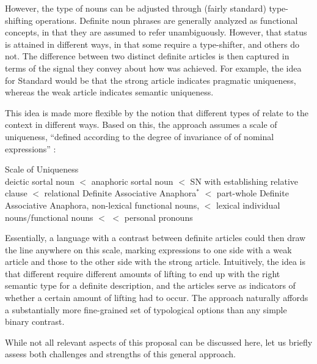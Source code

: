 \documentclass[output=paper
,modfonts
,nonflat]{langscibook}
\begin{document}
However, the type of nouns can be adjusted through (fairly standard)
type-shifting operations. Definite noun phrases are generally analyzed as functional
concepts, in that they are assumed to refer unambiguously. However,
that status is attained in different ways, in that some  require
a type-shifter, and others do not. The difference between two distinct
definite articles is then captured in terms of the signal they convey
about how  was achieved. For example, the idea for Standard
 would be that the strong article indicates pragmatic
uniqueness, whereas the weak article indicates semantic uniqueness.

This idea is made more flexible by the notion that different types of
 relate to the context in different ways. Based on
this, the approach assumes a scale of uniqueness, ``defined according to the degree of invariance
of  of nominal expressions'' \citep{Ortmann2014}:

\begin{exe} 
\ex Scale of Uniqueness\\
      deictic sortal noun $<$ anaphoric sortal noun $<$ SN with
      establishing relative clause $<$ relational Definite Associative
      Anaphora$^*$ $<$ part-whole
      Definite Associative
      Anaphora, non-lexical functional nouns, $<$ lexical individual
      nouns/functional nouns $<$  $<$ personal pronouns \citep[314; adapted from L\"obner 2011]{Ortmann2014}
\end{exe}

Essentially, a language with a contrast between definite articles
could then draw the line anywhere on this scale, marking expressions
to one side with a weak article and those to the other side with the
strong article. Intuitively, the
idea is that different  require different amounts of lifting to
end up with the right semantic type for a definite description, and
the articles serve as indicators of whether a certain amount of lifting
had to occur. The approach naturally affords a substantially more fine-grained set of
typological options than any simple binary contrast. 

While not all relevant aspects of this proposal can be discussed here, let
us briefly assess both challenges and strengths of this general
approach. 
\end{document}
